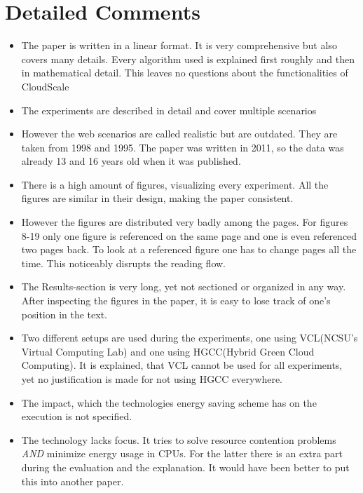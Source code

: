 \documentclass[a4paper]{article}
\begin{document}
\section{Detailed Comments}
\begin{itemize}
\setlength{\itemsep}{-2pt}
\item The paper is written in a linear format. It is very comprehensive but also covers many details. Every algorithm used is explained first roughly and then in mathematical detail. This leaves no questions about the functionalities of CloudScale
\item The experiments are described in detail and cover multiple scenarios
\item However the web scenarios are called realistic but are outdated. They are taken from 1998 and 1995. The paper was written in 2011, so the data was already 13 and 16 years old when it was published.
\item There is a high amount of figures, visualizing every experiment. All the figures are similar in their design, making the paper consistent.
\item However the figures are distributed very badly among the pages. For figures 8-19 only one figure is referenced on the same page and one is even referenced two pages back. To look at a referenced figure one has to change pages all the time. This noticeably disrupts the reading flow.
\item The Results-section is very long, yet not sectioned or organized in any way. After inspecting the figures in the paper, it is easy to lose track of one's position in the text.
\item Two different setups are used during the experiments, one using VCL(NCSU's Virtual Computing Lab) and one using HGCC(Hybrid Green Cloud Computing). It is explained, that VCL cannot be used for all experiments, yet no justification is made for not using HGCC everywhere. 
\item The impact, which the technologies energy saving scheme has on the execution is not specified.
\item The technology lacks focus. It tries to solve resource contention problems {\it AND} minimize energy usage in CPUs. For the latter there is an extra part during the evaluation and the explanation. It would have been better to put this into another paper.
\end{itemize}
\end{document}
